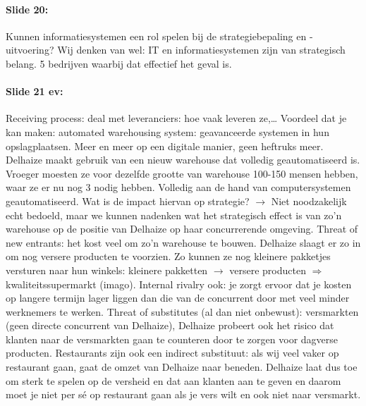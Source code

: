 \documentclass[10pt,a4paper]{report}
\begin{document}
\paragraph{Slide 20:}Kunnen informatiesystemen een rol spelen bij de strategiebepaling en -uitvoering? Wij denken van wel: IT en informatiesystemen zijn van strategisch belang. 5 bedrijven waarbij dat effectief het geval is.

\paragraph{Slide 21 ev:}Receiving process: deal met leveranciers: hoe vaak leveren ze,… Voordeel dat je kan maken: automated warehousing system: geavanceerde systemen in hun opslagplaatsen. Meer en meer op een digitale manier, geen heftruks meer. Delhaize maakt gebruik van een nieuw warehouse dat volledig geautomatiseerd is. Vroeger moesten ze voor dezelfde grootte van warehouse 100-150 mensen hebben, waar ze er nu nog 3 nodig hebben. Volledig aan de hand van computersystemen geautomatiseerd. Wat is de impact hiervan op strategie? $\rightarrow$ Niet noodzakelijk echt bedoeld, maar we kunnen nadenken wat het strategisch effect is van zo'n warehouse op de positie van Delhaize op haar concurrerende omgeving. Threat of new entrants: het kost veel om zo'n warehouse te bouwen. Delhaize slaagt er zo in om nog versere producten te voorzien. Zo kunnen ze nog kleinere pakketjes versturen naar hun winkels: kleinere pakketten $\rightarrow$ versere producten $\Rightarrow$ kwaliteitssupermarkt (imago). Internal rivalry ook: je zorgt ervoor dat je kosten op langere termijn lager liggen dan die van de concurrent door met veel minder werknemers te werken. Threat of substitutes (al dan niet onbewust): versmarkten (geen directe concurrent van Delhaize), Delhaize probeert ook het risico dat klanten naar de versmarkten gaan te counteren door te zorgen voor dagverse producten. Restaurants zijn ook een indirect substituut: als wij veel vaker op restaurant gaan, gaat de omzet van Delhaize naar beneden. Delhaize laat dus toe om sterk te spelen op de versheid en dat aan klanten aan te geven en daarom moet je niet per s\'e op restaurant gaan als je vers wilt en ook niet naar versmarkt.
\end{document}
